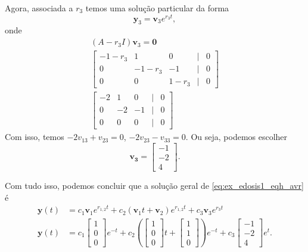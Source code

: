 \begin{ex}
  Agora, associada a $r_3$ temos uma solução particular da forma
  \begin{equation}
    \pmb{y}_3 = \pmb{v}_3e^{r_3t},
  \end{equation}
  onde
  \begin{gather}
    (A-r_3I)\pmb{v}_3 = \pmb{0} \\
    \begin{bmatrix}
      -1-r_3 & 1 & 0 & | & 0 \\
      0 & -1-r_3 & -1 & | & 0 \\
      0 & 0 & 1-r_3 & | & 0 
    \end{bmatrix}\\
    \begin{bmatrix}
      -2 & 1 & 0 & | & 0 \\
      0 & -2 & -1 & | & 0 \\
      0 & 0 & 0 & | & 0 
    \end{bmatrix}
  \end{gather}  
  Com isso, temos $-2v_{13}+v_{23}=0$, $-2v_{23}-v_{33}=0$. Ou seja, podemos escolher
  \begin{equation}
    \pmb{v_3} =
    \begin{bmatrix}
      -1 \\
      -2 \\
      4
    \end{bmatrix}.
  \end{equation}

  Com tudo isso, podemos concluir que a solução geral de \eqref{eq:ex_edosis1_eqh_avr} é
  \begin{align}
    \pmb{y}(t) &= c_1\pmb{v}_1e^{r_{1,2}t}+c_2\left(\pmb{v}_1t+\pmb{v}_2\right)e^{r_{1,2}t} + c_3\pmb{v}_3e^{r_3t} \\
    \pmb{y}(t) &= c_1
                 \begin{bmatrix}
                   1\\
                   0\\
                   0
                 \end{bmatrix}e^{-t} + c_2\left(
    \begin{bmatrix}
      1\\
      0\\
      0
    \end{bmatrix}t +
    \begin{bmatrix}
      1\\
      1\\
      0
    \end{bmatrix}\right)e^{-t} + c_3
    \begin{bmatrix}
      -1\\
      -2\\
      4
    \end{bmatrix}e^t.
  \end{align}
\end{ex}

